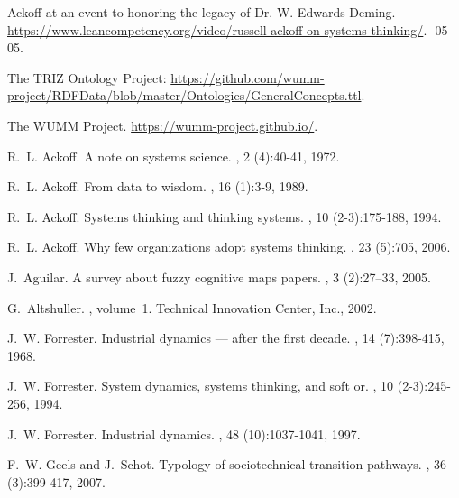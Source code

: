 \documentclass[a4paper,11pt]{article}
\begin{document}

\begin{thebibliography}{10}

 Ackoff at an event to honoring the legacy of
  Dr. W. Edwards Deming.  \newblock
  \url{https://www.leancompetency.org/video/russell-ackoff-on-systems-thinking/}.
  -05-05.

 The TRIZ Ontology Project:
  \url{https://github.com/wumm-project/RDFData/blob/master/Ontologies/GeneralConcepts.ttl}.

 {The WUMM Project}.
  \url{https://wumm-project.github.io/}. 

 R.~L. Ackoff.  \newblock A note on systems science.
  , 2 (4):40-41, 1972.

 R.~L. Ackoff.  \newblock From data to wisdom.
  , 16 (1):3-9, 1989.

 R.~L. Ackoff.  \newblock Systems thinking and
  thinking systems.  , 10 (2-3):175-188,
  1994.

 R.~L. Ackoff.  \newblock Why few organizations adopt
  systems thinking.  ,
  23 (5):705, 2006.

 J.~Aguilar.  \newblock A survey about fuzzy
  cognitive maps papers.  , 3 (2):27--33, 2005.

 G.~Altshuller.  , volume~1.  \newblock Technical Innovation Center, Inc.,
  2002.

 J.~W. Forrester.  \newblock Industrial
  dynamics — after the first decade.  ,
  14 (7):398-415, 1968.

 J.~W. Forrester.  \newblock System dynamics,
  systems thinking, and soft or.  ,
  10 (2-3):245-256, 1994.

 J.~W. Forrester.  \newblock Industrial
  dynamics.  ,
  48 (10):1037-1041, 1997.

 F.~W. Geels and J.~Schot.  \newblock Typology of
  sociotechnical transition pathways.  ,
  36 (3):399-417, 2007.


\end{thebibliography}
\end{document}
